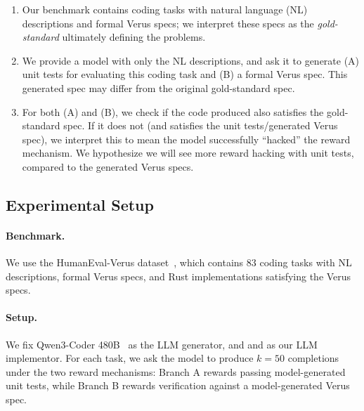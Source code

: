 \begin{enumerate}
    \item Our benchmark contains coding tasks 
    with natural language (NL) descriptions and formal Verus specs;
    we interpret these specs as the \emph{gold-standard}
    ultimately defining the problems.
    \item We provide a model with only the NL descriptions, 
    and ask it to generate 
    (A) unit tests for evaluating this coding task and 
    (B) a formal Verus spec. 
    This generated spec may differ from the original gold-standard spec.
    \item For both (A) and (B), we check if the code produced also satisfies
    the gold-standard spec. 
    If it does not (and satisfies the unit tests/generated Verus spec), 
    we interpret this to mean the model successfully ``hacked''
    the reward mechanism. 
    We hypothesize we will see more reward hacking with unit tests,
    compared to the generated Verus specs.
\end{enumerate}
\begin{figure}[h]

\end{figure}


\subsection{Experimental Setup}

\paragraph{Benchmark.} We use the HumanEval-Verus
dataset~\cite{alphaverus}, which contains 83 coding tasks with
NL descriptions, formal Verus specs, and Rust
implementations satisfying the Verus specs. 

\paragraph{Setup.} We fix Qwen3-Coder 480B~\cite{qwen3coder} as the LLM
generator, and and as our LLM implementor. For each task, we ask the model to
produce $k=50$ completions under the two reward mechanisms: Branch A rewards
passing model-generated unit tests, while Branch B rewards verification against
a model-generated Verus spec. 

